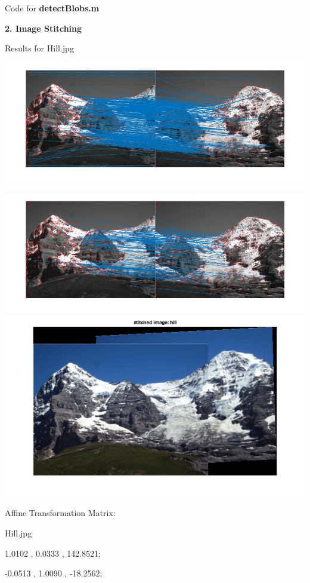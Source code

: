 \documentclass[fleqn]{article}
\begin{document}
\newpage

\vspace{10 mm}
Code for \textbf{detectBlobs.m}



\newpage

\textbf{\huge 2. Image Stitching}

\vspace{10 mm}

Results for Hill.jpg
\begin{center}
\includegraphics[width=1.2\textwidth]{hill1.jpg}

\includegraphics[width=1.2\textwidth]{hill2.jpg}
\newline
\includegraphics[width=1.2\textwidth]{hill3.jpg}

Affine Transformation Matrix:
\vspace{10 mm}

Hill.jpg

1.0102   ,   0.0333   ,   142.8521;

-0.0513  ,   1.0090   ,  -18.2562;

\end{center}
\end{document}
